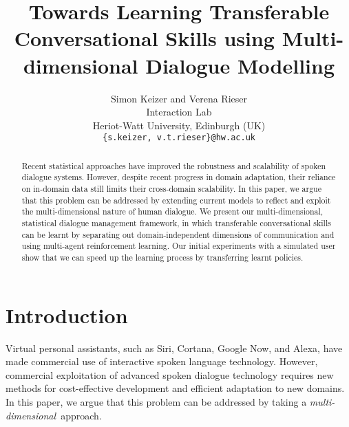 \documentclass[11pt]{article}
\title{Towards Learning Transferable Conversational Skills using Multi-dimensional Dialogue Modelling}
\author{Simon Keizer and Verena Rieser \\
  Interaction Lab \\
  Heriot-Watt University, Edinburgh (UK) \\
  {\tt \{s.keizer, v.t.rieser\}@hw.ac.uk} \\}
\date{}
\def\mdim{multi\hyp dimensional}
\begin{document}
\maketitle

\begin{abstract}
Recent statistical approaches have improved the robustness and scalability of spoken dialogue systems.  However, despite recent progress in domain adaptation, their reliance on in-domain data still limits their cross-domain scalability.  In this paper, we argue that this problem can be addressed by extending current models to reflect and exploit the multi-dimensional nature of human dialogue.  We present our multi-dimensional, statistical dialogue management framework, in which transferable conversational skills can be learnt by separating out domain-independent dimensions of communication and using multi-agent reinforcement learning.  Our initial experiments with a simulated user show that we can speed up the learning process by transferring learnt policies.
\end{abstract}


\section{Introduction}\label{sec:intro}

Virtual personal assistants, such as Siri, Cortana, Google Now, and Alexa, have made commercial use of interactive spoken language technology.  However, commercial exploitation of advanced spoken dialogue technology requires new methods for cost-effective development and efficient adaptation to new domains.  In this paper, we argue that this problem can be addressed by taking a \emph{\mdim\ }approach.
\end{document}
